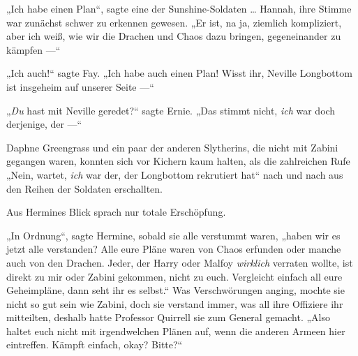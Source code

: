 „Ich habe einen Plan“, sagte eine der Sunshine-Soldaten … Hannah, ihre Stimme war zunächst schwer zu erkennen gewesen.
„Er ist, na ja, ziemlich kompliziert, aber ich weiß, wie wir die Drachen und Chaos dazu bringen, gegeneinander zu kämpfen —“

„Ich auch!“ sagte Fay.
„Ich habe auch einen Plan! Wisst ihr, Neville Longbottom ist insgeheim auf unserer Seite —“

„\emph{Du} hast mit Neville geredet?“ sagte Ernie.
„Das stimmt nicht, \emph{ich} war doch derjenige, der —“

Daphne Greengrass und ein paar der anderen Slytherins, die nicht mit Zabini gegangen waren, konnten sich vor Kichern kaum halten, als die zahlreichen Rufe
„Nein, wartet, \emph{ich} war der, der Longbottom rekrutiert hat“ nach und nach aus den Reihen der Soldaten erschallten.

Aus Hermines Blick sprach nur totale Erschöpfung.

„In Ordnung“, sagte Hermine, sobald sie alle verstummt waren, „haben wir es jetzt alle verstanden? Alle eure Pläne waren von Chaos erfunden oder manche auch von den Drachen. Jeder, der Harry oder Malfoy \emph{wirklich} verraten wollte, ist direkt zu mir oder Zabini gekommen, nicht zu euch. Vergleicht einfach all eure Geheimpläne, dann seht ihr es selbst.“ Was Verschwörungen anging, mochte sie nicht so gut sein wie Zabini, doch sie verstand immer, was all ihre Offiziere ihr mitteilten, deshalb hatte Professor Quirrell sie zum General gemacht.
„Also haltet euch nicht mit irgendwelchen Plänen auf, wenn die anderen Armeen hier eintreffen. Kämpft einfach, okay? Bitte?“

